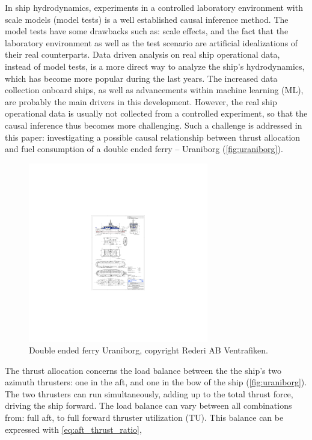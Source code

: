 \documentclass[fleqn,10pt]{olplainarticle}
\begin{document}
In ship hydrodynamics, experiments in a controlled laboratory environment with scale models (model tests) is a well established causal inference method.  
The model tests have some drawbacks such as: scale effects, and the fact that the laboratory environment as well as the test scenario are artificial idealizations of their real counterparts.
Data driven analysis on real ship operational data, instead of model tests, is a more direct way to analyze the ship's hydrodynamics, which has become more popular during the last years. The increased data collection onboard ships, as well as advancements within machine learning (ML), are probably the main drivers in this development. However, the real ship operational data is usually not collected from a controlled experiment, so that the causal inference thus becomes more challenging. Such a challenge is addressed in this paper: investigating a possible causal relationship between thrust allocation and fuel consumption of a double ended ferry -- Uraniborg (\autoref{fig:uraniborg}).
\begin{figure}[!htb]
    \centering
    \includegraphics[width=0.7\textwidth]{figures/GA_uraniborg.pdf}
    \caption{Double ended ferry Uraniborg, copyright Rederi AB Ventrafiken.}
    \label{fig:uraniborg}
\end{figure}
The thrust allocation concerns the load balance between the the ship's two azimuth thrusters: one in the aft, and one in the bow of the ship (\autoref{fig:uraniborg}). The two thrusters can run simultaneously, adding up to the total thrust force, driving the ship forward. The load balance can vary between all combinations from: full aft, to full forward thruster utilization (TU). This balance can be expressed with \autoref{eq:aft_thrust_ratio},
\end{document}

